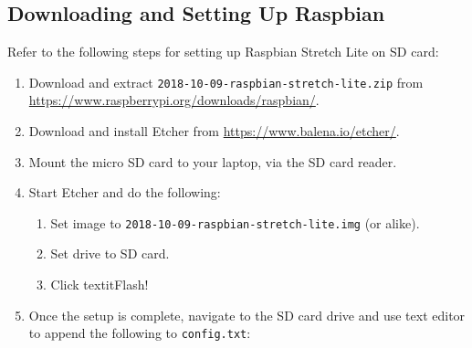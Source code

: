 \documentclass[onecolumn, draftclsnofoot, 10pt, compsoc]{IEEEtran}
\begin{document}
\subsection{Downloading and Setting Up Raspbian}
Refer to the following steps for setting up Raspbian Stretch Lite on SD card:
\begin{enumerate}
\item Download and extract \texttt{2018-10-09-raspbian-stretch-lite.zip} from \url{https://www.raspberrypi.org/downloads/raspbian/}.
\item Download and install Etcher from \url{https://www.balena.io/etcher/}.
\item Mount the micro SD card to your laptop, via the SD card reader.
\item Start Etcher and do the following:
    \begin{enumerate}
    \item Set image to \texttt{2018-10-09-raspbian-stretch-lite.img} (or alike).
    \item Set drive to SD card.
    \item Click textit{Flash!}
    \end{enumerate}
\item Once the setup is complete, navigate to the SD card drive and use text editor to append the following to \texttt{config.txt}:
\inputminted[breaklines]{bash}{cs2.sh}
\end{enumerate}
\end{document}
